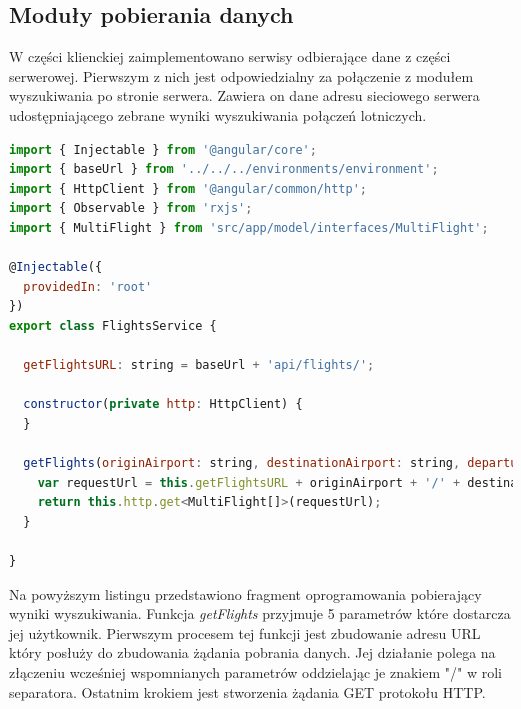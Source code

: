 \documentclass[12pt, twoside]{report}
\begin{document}
\subsection{Moduły pobierania danych}
W części klienckiej zaimplementowano serwisy odbierające dane z części serwerowej. Pierwszym z nich jest odpowiedzialny za połączenie z modułem wyszukiwania po stronie serwera. Zawiera on dane adresu sieciowego serwera udostępniającego zebrane wyniki wyszukiwania połączeń lotniczych.
\begin{lstlisting}[language=JavaScript, caption= Kod źródłowy funkcji pobierającej wyniki z serwera]
import { Injectable } from '@angular/core';
import { baseUrl } from '../../../environments/environment';
import { HttpClient } from '@angular/common/http';
import { Observable } from 'rxjs';
import { MultiFlight } from 'src/app/model/interfaces/MultiFlight';

@Injectable({
  providedIn: 'root'
})
export class FlightsService {

  getFlightsURL: string = baseUrl + 'api/flights/';

  constructor(private http: HttpClient) {
  }

  getFlights(originAirport: string, destinationAirport: string, departureDate: string, typeOfConnection: string, currency: string) : Observable<MultiFlight[]>{
    var requestUrl = this.getFlightsURL + originAirport + '/' + destinationAirport + '/' + departureDate + '/' + typeOfConnection + '/' + currency;
    return this.http.get<MultiFlight[]>(requestUrl);   
  }

}
\end{lstlisting}
Na powyższym listingu przedstawiono fragment oprogramowania pobierający wyniki wyszukiwania. Funkcja \textit{getFlights} przyjmuje 5 parametrów które dostarcza jej użytkownik. Pierwszym procesem tej funkcji jest zbudowanie adresu URL który posłuży do zbudowania żądania pobrania danych. Jej działanie polega na złączeniu wcześniej wspomnianych parametrów oddzielając je znakiem "/" w roli separatora. Ostatnim krokiem jest stworzenia żądania GET protokołu HTTP.
\end{document}
